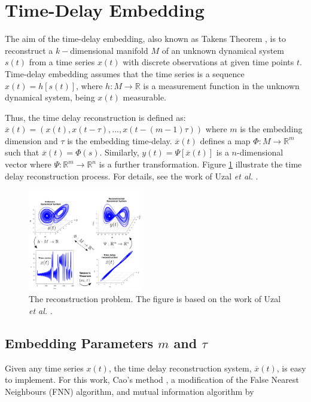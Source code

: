 \documentclass[10pt,journal,compsoc]{IEEEtran}
\begin{document}
\section{Time-Delay Embedding}
The aim of the time-delay embedding, also known as Takens Theorem \cite{Takens1981},
is to reconstruct a $k-$dimensional manifold $M$ of an unknown dynamical system $s(t)$
from a time series $x(t)$ with discrete observations at given time points $t$.
Time-delay embedding assumes that the time series
is a sequence $x(t)=h[s(t)]$,  where  $h: M \rightarrow \mathbb{R}$
is a measurement function in the unknown dynamical system, being $x(t)$ measurable.

Thus, the time delay reconstruction is defined as:
$\overline{x}(t) = (x(t), x(t-\tau),...,x(t-(m-1)\tau))$
where $m$ is the embedding dimension and $\tau$ is the embedding time-delay.
$\overline{x}(t)$ defines a map $\varPhi: M \rightarrow \mathbb{R}^m$ such that
$\overline{x}(t) = \varPhi(s)$.
Similarly, $y(t)= \varPsi [\overline{x}(t)]$ is a $n$-dimensional vector
where $\varPsi: \mathbb{R}^m \rightarrow \mathbb{R}^n$ is a further transformation.
Figure \ref{fig:takenstheorem} illustrate the time delay reconstruction process.
For details, see the work of Uzal \emph{et al.} \cite{Uzal2011}.

\begin{figure}[!htb]
\centering
\includegraphics[width=0.45\textwidth]{takenstheorem}
\caption[PA]{The reconstruction problem. The figure is based on the work of Uzal
\emph{et al.} \cite{Uzal2011}.}
\label{fig:takenstheorem}
\end{figure}

\subsection{Embedding Parameters $m$ and $\tau$}
Given any time series $x(t)$, the time delay reconstruction system, $\overline{x}(t)$,
is easy to implement. For this work, Cao's method \cite{Cao1997}, a modification of the
False Nearest Neighbours (FNN) algorithm, and mutual information algorithm by
\end{document}
